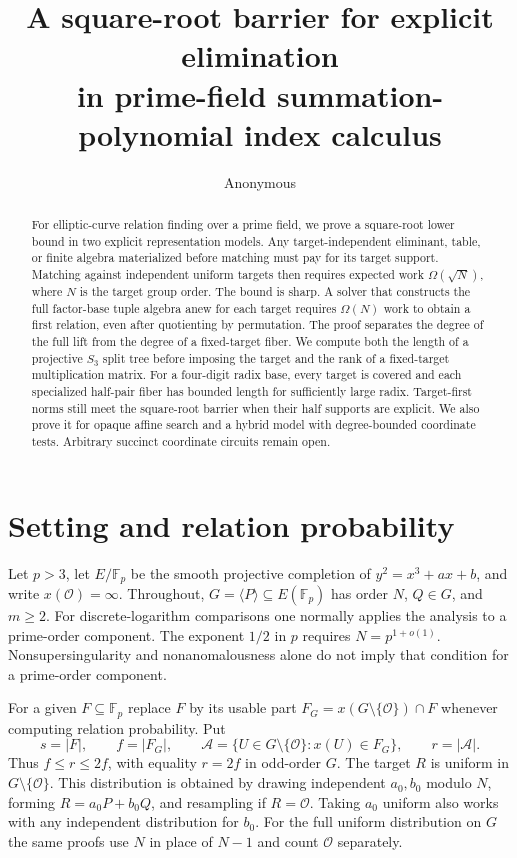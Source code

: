 \documentclass[11pt]{article}
\title{A square-root barrier for explicit elimination\\in prime-field summation-polynomial index calculus}
\author{Anonymous}
\date{}
\newcommand{\Fp}{\mathbb F_p}
\newcommand{\OO}{\mathcal O}
\newcommand{\A}{\mathcal A}
\begin{document}
\maketitle
\begin{abstract}
For elliptic-curve relation finding over a prime field, we prove a square-root lower bound in two explicit representation models. Any target-independent eliminant, table, or finite algebra materialized before matching must pay for its target support. Matching against independent uniform targets then requires expected work \(\Omega(\sqrt N)\), where \(N\) is the target group order. The bound is sharp. A solver that constructs the full factor-base tuple algebra anew for each target requires \(\Omega(N)\) work to obtain a first relation, even after quotienting by permutation. The proof separates the degree of the full lift from the degree of a fixed-target fiber. We compute both the length of a projective \(S_3\) split tree before imposing the target and the rank of a fixed-target multiplication matrix. For a four-digit radix base, every target is covered and each specialized half-pair fiber has bounded length for sufficiently large radix. Target-first norms still meet the square-root barrier when their half supports are explicit. We also prove it for opaque affine search and a hybrid model with degree-bounded coordinate tests. Arbitrary succinct coordinate circuits remain open.
\end{abstract}

\section{Setting and relation probability}

Let \(p>3\), let \(E/\Fp\) be the smooth projective completion of
\(y^2=x^3+ax+b\), and write \(x(\OO)=\infty\). Throughout, \(G=\langle P\rangle\subseteq E(\Fp)\) has order \(N\), \(Q\in G\), and \(m\ge 2\). For discrete-logarithm comparisons one normally applies the analysis to a prime-order component. The exponent \(1/2\) in \(p\) requires \(N=p^{1+o(1)}\). Nonsupersingularity and nonanomalousness alone do not imply that condition for a prime-order component.

For a given \(F\subseteq\Fp\) replace \(F\) by its usable part \(F_G=x(G\setminus\{\OO\})\cap F\) whenever computing relation probability. Put
\[
s=|F|,\qquad f=|F_G|,\qquad
\A=\{U\in G\setminus\{\OO\}:x(U)\in F_G\},\qquad r=|\A|.
\]
Thus \(f\le r\le 2f\), with equality \(r=2f\) in odd-order \(G\). The target \(R\) is uniform in \(G\setminus\{\OO\}\). This distribution is obtained by drawing independent \(a_0,b_0\) modulo \(N\), forming \(R=a_0P+b_0Q\), and resampling if \(R=\OO\). Taking \(a_0\) uniform also works with any independent distribution for \(b_0\). For the full uniform distribution on \(G\) the same proofs use \(N\) in place of \(N-1\) and count \(\OO\) separately.
\end{document}
